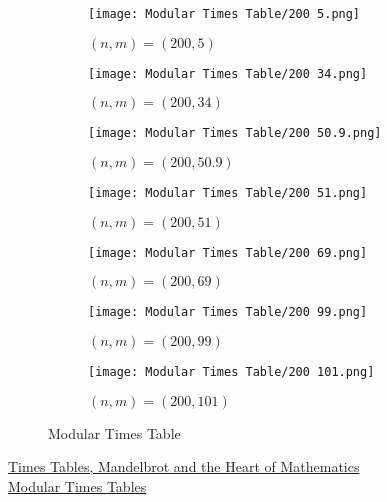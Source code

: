 \documentclass[../../Problems]{subfiles}
\begin{document}
\begin{figure}[H]
	\begin{subfigure}{0.145\linewidth}
		\texttt{[image: Modular Times Table/200 5.png]}
		\caption{$(n,m) = (200,5)$}
	\end{subfigure}
	\begin{subfigure}{0.145\linewidth}
		\texttt{[image: Modular Times Table/200 34.png]}
		\caption{$(n,m) = (200,34)$}
	\end{subfigure}
	\begin{subfigure}{0.145\linewidth}
		\texttt{[image: Modular Times Table/200 50.9.png]}
		\caption{$(n,m) = (200,50.9)$}
	\end{subfigure}
	\begin{subfigure}{0.145\linewidth}
		\texttt{[image: Modular Times Table/200 51.png]}
		\caption{$(n,m) = (200,51)$}
	\end{subfigure}
	\begin{subfigure}{0.145\linewidth}
		\texttt{[image: Modular Times Table/200 69.png]}
		\caption{$(n,m) = (200,69)$}
	\end{subfigure}
	\begin{subfigure}{0.145\linewidth}
		\texttt{[image: Modular Times Table/200 99.png]}
		\caption{$(n,m) = (200,99)$}
	\end{subfigure}
	\begin{subfigure}{0.145\linewidth}
		\texttt{[image: Modular Times Table/200 101.png]}
		\caption{$(n,m) = (200,101)$}
	\end{subfigure}
	\caption{Modular Times Table}
	\label{fig:timestabletestcases}
\end{figure}
\begin{funvideo}
	\href{https://youtu.be/qhbuKbxJsk8}{Times Tables, Mandelbrot and the Heart of Mathematics}\\
	\href{https://www.geogebra.org/m/z8wrdret}{Modular Times Tables}
\end{funvideo}
\recalctypearea
\end{document}

